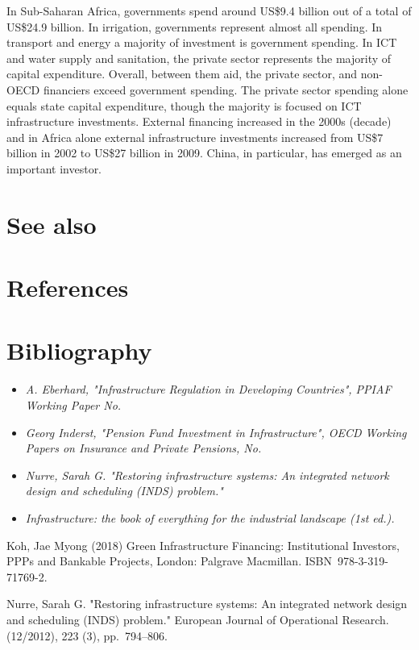 In Sub-Saharan Africa, governments spend around US\$9.4 billion out of a
total of US\$24.9 billion. In irrigation, governments represent almost
all spending. In transport and energy a majority of investment is
government spending. In ICT and water supply and sanitation, the private
sector represents the majority of capital expenditure. Overall, between
them aid, the private sector, and non-OECD financiers exceed government
spending. The private sector spending alone equals state capital
expenditure, though the majority is focused on ICT infrastructure
investments. External financing increased in the 2000s (decade) and in
Africa alone external infrastructure investments increased from US\$7
billion in 2002 to US\$27 billion in 2009. China, in particular, has
emerged as an important investor.

\section{See also}\label{see-also}

\section{References}\label{references}

\section{Bibliography}\label{bibliography}

\begin{itemize}
\item
  \emph{A. Eberhard, "Infrastructure Regulation in Developing
  Countries", PPIAF Working Paper No.}
\item
  \emph{Georg Inderst, "Pension Fund Investment in Infrastructure", OECD
  Working Papers on Insurance and Private Pensions, No.}
\item
  \emph{Nurre, Sarah G. "Restoring infrastructure systems: An integrated
  network design and scheduling (INDS) problem."}
\item
  \emph{Infrastructure: the book of everything for the industrial
  landscape (1st ed.).}
\end{itemize}

Koh, Jae Myong (2018) Green Infrastructure Financing: Institutional
Investors, PPPs and Bankable Projects, London: Palgrave Macmillan.
ISBN~978-3-319-71769-2.

Nurre, Sarah G. "Restoring infrastructure systems: An integrated network
design and scheduling (INDS) problem." European Journal of Operational
Research. (12/2012), 223 (3), pp.~794--806.

